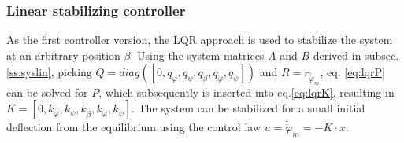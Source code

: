\documentclass{article}
\begin{document}
\subsubsection{Linear stabilizing controller}
As the first controller version, the LQR approach is used to stabilize the system at an arbitrary position $\beta$:
Using the system matrices $A$ and $B$ derived in subsec. \ref{ss:syslin}, picking $Q = diag \left( \left[0, q_{\varphi}, q_{\psi}, q_{\dot{\beta}}, q_{\dot{\varphi}}, q_{\dot{\psi}} \right] \right)$ and $R = r_{\breve{\dot{\varphi}}_m}$, eq. \ref{eq:lqrP} can be solved for $P$, which subsequently is inserted into eq.\ref{eq:lqrK}, resulting in $K = \left[0, k_{\varphi}, k_{\psi}, k_{\dot{\beta}}, k_{\dot{\varphi}}, k_{\dot{\psi}} \right]$. The system can be stabilized for a small initial deflection from the equilibrium using the control law $u=\breve{\dot{\varphi}}_m=-K \cdot x$.
\end{document}
